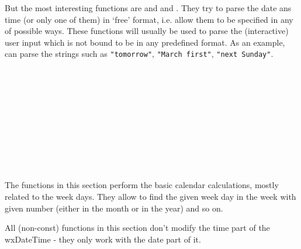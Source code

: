 But the most interesting functions are 
 and 
 and 
. They try to parse the date ans time
(or only one of them) in `free' format, i.e. allow them to be specified in any
of possible ways. These functions will usually be used to parse the
(interactive) user input which is not bound to be in any predefined format. As
an example,  can parse the
strings such as {\tt "tomorrow"}, {\tt "March first"}, {\tt "next Sunday"}.

\\
\\
\\
\\
\\
\\
\\
\\
\\

\label{wxdatetimecalculations}

The functions in this section perform the basic calendar calculations, mostly
related to the week days. They allow to find the given week day in the
week with given number (either in the month or in the year) and so on.

All (non-const) functions in this section don't modify the time part of the
wxDateTime - they only work with the date part of it.

